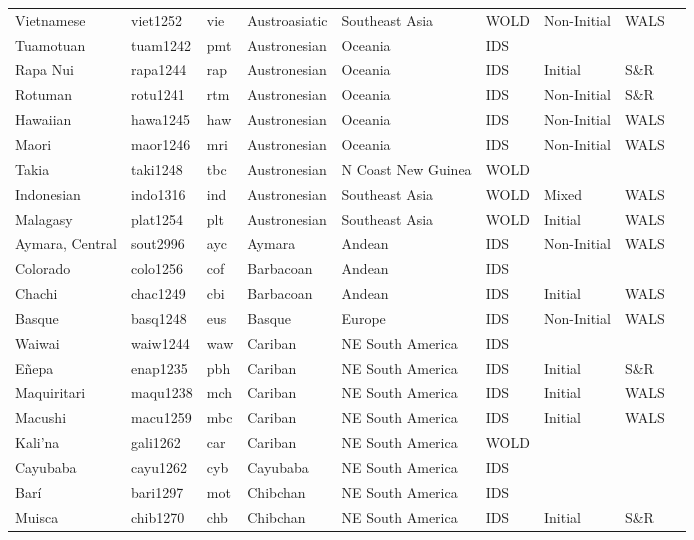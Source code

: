 \begin{longtable}{lllllllll}
  Vietnamese & viet1252 & vie & Austroasiatic & Southeast Asia & WOLD & Non-Initial & WALS &  \\ 
  Tuamotuan & tuam1242 & pmt & Austronesian & Oceania & IDS &  &  &  \\ 
  Rapa Nui & rapa1244 & rap & Austronesian & Oceania & IDS & Initial & S\&R & \cite[19]{feu_rapanui1996}\cite[73]{weberrobert_rapanui1988_o.pdf} \\ 
  Rotuman & rotu1241 & rtm & Austronesian & Oceania & IDS & Non-Initial & S\&R & \cite[19]{vamarasi_rotuman2002.pdf} \\ 
  Hawaiian & hawa1245 & haw & Austronesian & Oceania & IDS & Non-Initial & WALS &  \\ 
  Maori & maor1246 & mri & Austronesian & Oceania & IDS & Non-Initial & WALS &  \\ 
  Takia & taki1248 & tbc & Austronesian & N Coast New Guinea & WOLD &  &  &  \\ 
  Indonesian & indo1316 & ind & Austronesian & Southeast Asia & WOLD & Mixed & WALS &  \\ 
  Malagasy & plat1254 & plt & Austronesian & Southeast Asia & WOLD & Initial & WALS &  \\ 
  Aymara, Central & sout2996 & ayc & Aymara & Andean & IDS & Non-Initial & WALS &  \\ 
  Colorado & colo1256 & cof & Barbacoan & Andean & IDS &  &  &  \\ 
  Chachi & chac1249 & cbi & Barbacoan & Andean & IDS & Initial & WALS &  \\ 
  Basque & basq1248 & eus & Basque & Europe & IDS & Non-Initial & WALS &  \\ 
  Waiwai & waiw1244 & waw & Cariban & NE South America & IDS &  &  &  \\ 
  Eñepa & enap1235 & pbh & Cariban & NE South America & IDS & Initial & S\&R & \cite[380]{payne-payne_panare2013.pdf} \\ 
  Maquiritari & maqu1238 & mch & Cariban & NE South America & IDS & Initial & WALS &  \\ 
  Macushi & macu1259 & mbc & Cariban & NE South America & IDS & Initial & WALS &  \\ 
  Kali'na & gali1262 & car & Cariban & NE South America & WOLD &  &  &  \\ 
  Cayubaba & cayu1262 & cyb & Cayubaba & NE South America & IDS &  &  &  \\ 
  Barí & bari1297 & mot & Chibchan & NE South America & IDS &  &  &  \\ 
  Muisca & chib1270 & chb & Chibchan & NE South America & IDS & Initial & S\&R & \cite[22]{ostler_muisca1994_o.pdf} \\ 

\end{longtable}
